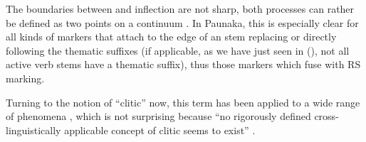 The boundaries between  and inflection are not sharp, both processes can rather be defined as two points on a continuum \citep[261]{Croft2000}. In Paunaka, this is especially clear for all kinds of markers that attach to the edge of an  stem replacing or directly following the thematic suffixes (if applicable, as we have just seen in (), not all active verb stems have a thematic suffix), thus those markers which fuse with RS marking.

Turning to the notion of “clitic” now, this term has been applied to a wide range of phenomena \citep[388]{Nevis2000}, which is not surprising because “no rigorously defined cross-linguistically applicable concept of clitic seems to exist” \citep[276]{Haspelmath2015}.

